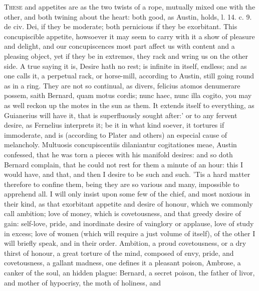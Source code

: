 {\lettrine{T}{hese}  and  appetites are as the two twists of a
rope, mutually mixed one with the other, and both twining about the
heart: both good, as Austin, holds, l. 14. c. 9. de civ. Dei, if
they be moderate; both pernicious if they be exorbitant. This
concupiscible appetite, howsoever it may seem to carry with it a show
of pleasure and delight, and our concupiscences most part affect us
with content and a pleasing object, yet if they be in extremes, they
rack and wring us on the other side. A true saying it is, Desire hath
no rest; is infinite in itself, endless; and as one calls it, a
perpetual rack, or horse-mill, according to Austin, still going
round as in a ring. They are not so continual, as divers, felicius
atomos denumerare possem, saith Bernard, quam motus cordis; nunc
haec, nunc illa cogito, you may as well reckon up the motes in the sun
as them. It extends itself to everything, as Guianerius will have
it, that is superfluously sought after:' or to any fervent
desire, as Fernelius interprets it; be it in what kind soever, it
tortures if immoderate, and is (according to  Plater and others)
an especial cause of melancholy. Multuosis concupiscentiis dilaniantur
cogitationes meae, Austin confessed, that he was torn a pieces
with his manifold desires: and so doth  Bernard complain, that he
could not rest for them a minute of an hour: this I would have, and
that, and then I desire to be such and such. 'Tis a hard matter
therefore to confine them, being they are so various and many,
impossible to apprehend all. I will only insist upon some few of the
chief, and most noxious in their kind, as that exorbitant appetite and
desire of honour, which we commonly call ambition; love of money, which
is covetousness, and that greedy desire of gain: self-love, pride, and
inordinate desire of vainglory or applause, love of study in excess;
love of women (which will require a just volume of itself), of the
other I will briefly speak, and in their order.
Ambition, a proud covetousness, or a dry thirst of honour, a great
torture of the mind, composed of envy, pride, and covetousness, a
gallant madness, one defines it a pleasant poison, Ambrose, a
canker of the soul, an hidden plague: Bernard, a secret poison,
the father of livor, and mother of hypocrisy, the moth of holiness, and
}
